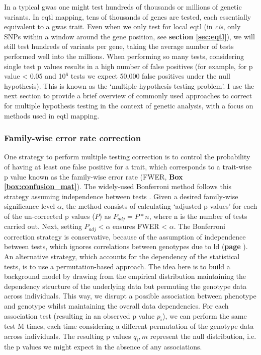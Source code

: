 In a typical \gls{gwas} one might test hundreds of thousands or millions of genetic variants. 
In e\gls{qtl} mapping, tens of thousands of genes are tested, each essentially equivalent to a \gls{gwas} trait. 
Even when we only test for local e\gls{qtl} (in \textit{cis}, only SNPs within a window around the gene position, see \textbf{section \ref{sec:eqtl}}), we will still test hundreds of variants per gene, taking the average number of tests performed well into the millions.
When performing so many tests, considering single test p values results in a high number of false positives (for example, for p value < 0.05 and 10$^6$ tests we expect 50,000 false positives under the null hypothesis). 
This is known as the `multiple hypothesis testing problem'. 
I use the next section to provide a brief overview of commonly used approaches to correct for multiple hypothesis testing in the context of genetic analysis, with a focus on methods used in e\gls{qtl} mapping.

\subsubsection{Family-wise error rate correction} 

One strategy to perform multiple testing correction is to control the probability of having at least one false positive for a trait, which corresponds to a trait-wise p value known as the family-wise error rate (FWER, \textbf{Box \ref{box:confusion_mat}}).
The widely-used Bonferroni method follows this strategy assuming independence between tests \cite{laird2010fundamentals}. 
Given a desired family-wise significance level $\alpha$, the method consists of calculating `adjusted p values' for each of the un-corrected p values ($P$) as $P_{adj} = P*n $, where n is the number of tests carried out.
Next, setting $P_{adj} < \alpha$ ensures FWER < $\alpha$. 
The Bonferroni correction strategy is conservative, because of the assumption of independence between tests, which ignores correlations between genotypes due to \gls{ld} (\textbf{page \pageref{sec:ld}}).\\

An alternative strategy, which accounts for the dependency of the statistical tests, is to use a permutation-based approach. 
The idea here is to build a background model by drawing from the empirical distribution maintaining the dependency structure of the underlying data but permuting the genotype data across individuals.
This way, we disrupt a possible association between phenotype and genotype whilst maintaining the overall data dependencies. 
For each association test (resulting in an observed p value $p_i$), we can perform the same test M times, each time considering a different permutation of the genotype data across individuals. 
The resulting p values $q_i,m$ represent the null distribution, i.e. the p values we might expect in the absence of any associations.\\


